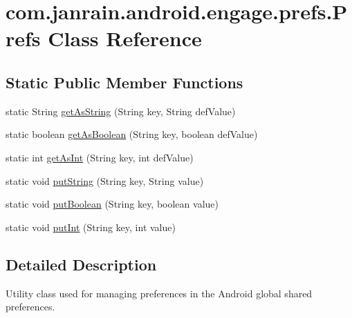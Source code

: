 \hypertarget{classcom_1_1janrain_1_1android_1_1engage_1_1prefs_1_1_prefs}{
\section{com.janrain.android.engage.prefs.Prefs Class Reference}
\label{classcom_1_1janrain_1_1android_1_1engage_1_1prefs_1_1_prefs}
}
\subsection*{Static Public Member Functions}
\begin{DoxyCompactItemize}
\item 
static String \hyperlink{classcom_1_1janrain_1_1android_1_1engage_1_1prefs_1_1_prefs_ad6a631e349be17f7f37a21887f0a0f93}{getAsString} (String key, String defValue)
\item 
static boolean \hyperlink{classcom_1_1janrain_1_1android_1_1engage_1_1prefs_1_1_prefs_a5a1b714e0453e411e9137122ed06702c}{getAsBoolean} (String key, boolean defValue)
\item 
static int \hyperlink{classcom_1_1janrain_1_1android_1_1engage_1_1prefs_1_1_prefs_ade16caf42cb3b1c68c2bf668b172c494}{getAsInt} (String key, int defValue)
\item 
static void \hyperlink{classcom_1_1janrain_1_1android_1_1engage_1_1prefs_1_1_prefs_a47db877f939253f0bc4420fb47be4b67}{putString} (String key, String value)
\item 
static void \hyperlink{classcom_1_1janrain_1_1android_1_1engage_1_1prefs_1_1_prefs_a1018311d506fa85080b71ff89a4d6e99}{putBoolean} (String key, boolean value)
\item 
static void \hyperlink{classcom_1_1janrain_1_1android_1_1engage_1_1prefs_1_1_prefs_a219cce35af2b7a85f54dd3f3518ff72c}{putInt} (String key, int value)
\end{DoxyCompactItemize}


\subsection{Detailed Description}
Utility class used for managing preferences in the Android global shared preferences. 

